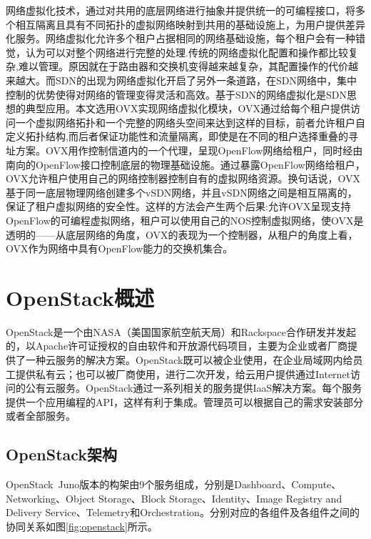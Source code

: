 网络虚拟化技术\cite{Virtual-1}，通过对共用的底层网络进行抽象并提供统一的可编程接口，将多个相互隔离且具有不同拓扑的虚拟网络映射到共用的基础设施上，为用户提供差异化服务。网络虚拟化允许多个租户占据相同的网络基础设施，每个租户会有一种错觉，认为可以对整个网络进行完整的处理.传统的网络虚拟化配置和操作都比较复杂,难以管理。原因就在于路由器和交换机变得越来越复杂，其配置操作的代价越来越大。而SDN的出现为网络虚拟化开启了另外一条道路，在SDN网络中，集中控制的优势使得对网络的管理变得灵活和高效。基于SDN的网络虚拟化是SDN思想的典型应用。本文选用OVX实现网络虚拟化模块，OVX通过给每个租户提供访问一个虚拟网络拓扑和一个完整的网络头空间来达到这样的目标，前者允许租户自定义拓扑结构,而后者保证功能性和流量隔离，即使是在不同的租户选择重叠的寻址方案。OVX用作控制信道内的一个代理，呈现OpenFlow网络给租户，同时经由南向的OpenFlow接口控制底层的物理基础设施。通过暴露OpenFlow网络给租户，OVX允许租户使用自己的网络控制器控制自有的虚拟网络资源。换句话说，OVX基于同一底层物理网络创建多个vSDN网络，并且vSDN网络之间是相互隔离的，保证了租户虚拟网络的安全性。这样的方法会产生两个后果:允许OVX呈现支持OpenFlow的可编程虚拟网络，租户可以使用自己的NOS控制虚拟网络，使OVX是透明的——从底层网络的角度，OVX的表现为一个控制器，从租户的角度上看，OVX作为网络中具有OpenFlow能力的交换机集合\cite{OVX-2}。

\section{OpenStack概述}

OpenStack是一个由NASA（美国国家航空航天局）和Rackspace合作研发并发起的，以Apache许可证授权的自由软件和开放源代码项目，主要为企业或者厂商提供了一种云服务的解决方案。OpenStack既可以被企业使用，在企业局域网内给员工提供私有云；也可以被厂商使用，进行二次开发，给云用户提供通过Internet访问的公有云服务。OpenStack通过一系列相关的服务提供IaaS解决方案。每个服务提供一个应用编程的API，这样有利于集成。管理员可以根据自己的需求安装部分或者全部服务。

\subsection{OpenStack架构}
OpenStack\ Juno版本的构架由9个服务组成，分别是Dashboard、Compute、Networking、Object Storage、Block Storage、Identity、Image Registry and Delivery Service、Telemetry和Orchestration。分别对应的各组件及各组件之间的协同关系如图\ref{fig:openstack}所示。

